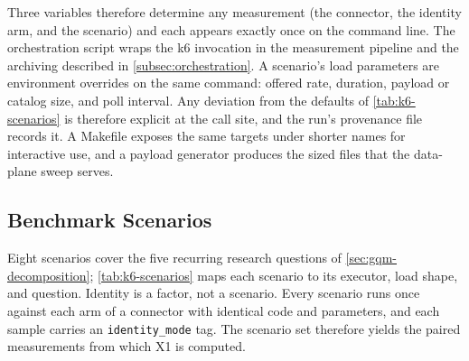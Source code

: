 Three variables therefore determine any measurement (the connector, the identity arm, and the scenario) and each appears exactly once on the command line. The orchestration script wraps the k6 invocation in the measurement pipeline and the archiving described in \cref{subsec:orchestration}. A scenario's load parameters are environment overrides on the same command: offered rate, duration, payload or catalog size, and poll interval. Any deviation from the defaults of \cref{tab:k6-scenarios} is therefore explicit at the call site, and the run's provenance file records it. A Makefile exposes the same targets under shorter names for interactive use, and a payload generator produces the sized files that the data-plane sweep serves.

\subsection{Benchmark Scenarios}\label{subsec:scenarios}

Eight scenarios cover the five recurring research questions of \cref{sec:gqm-decomposition}; \cref{tab:k6-scenarios} maps each scenario to its executor, load shape, and question. Identity is a factor, not a scenario. Every scenario runs once against each arm of a connector with identical code and parameters, and each sample carries an \texttt{identity\_mode} tag. The scenario set therefore yields the paired measurements from which X1 is computed.

